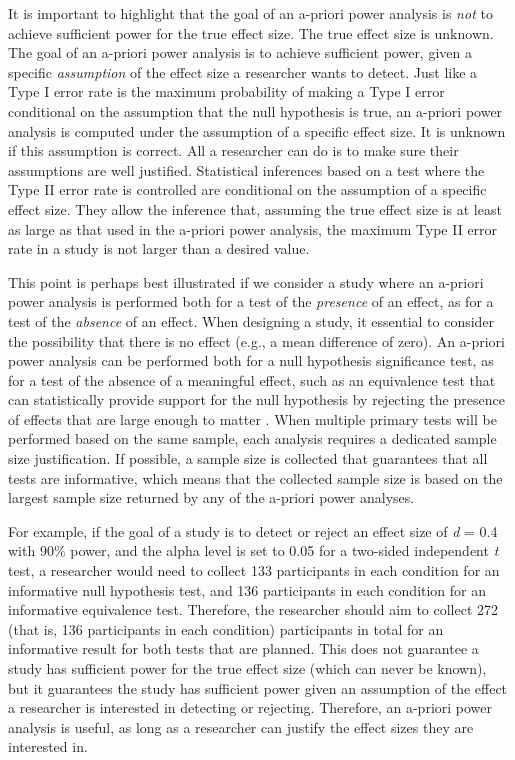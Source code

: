 \documentclass[
  oneside]{krantz}
\begin{document}
It is important to highlight that the goal of an a-priori power analysis is \emph{not} to achieve sufficient power for the true effect size. The true effect size is unknown. The goal of an a-priori power analysis is to achieve sufficient power, given a specific \emph{assumption} of the effect size a researcher wants to detect. Just like a Type I error rate is the maximum probability of making a Type I error conditional on the assumption that the null hypothesis is true, an a-priori power analysis is computed under the assumption of a specific effect size. It is unknown if this assumption is correct. All a researcher can do is to make sure their assumptions are well justified. Statistical inferences based on a test where the Type II error rate is controlled are conditional on the assumption of a specific effect size. They allow the inference that, assuming the true effect size is at least as large as that used in the a-priori power analysis, the maximum Type II error rate in a study is not larger than a desired value.

This point is perhaps best illustrated if we consider a study where an a-priori power analysis is performed both for a test of the \emph{presence} of an effect, as for a test of the \emph{absence} of an effect. When designing a study, it essential to consider the possibility that there is no effect (e.g., a mean difference of zero). An a-priori power analysis can be performed both for a null hypothesis significance test, as for a test of the absence of a meaningful effect, such as an equivalence test that can statistically provide support for the null hypothesis by rejecting the presence of effects that are large enough to matter \citep{meyners_equivalence_2012, lakens_equivalence_2017, rogers_using_1993}. When multiple primary tests will be performed based on the same sample, each analysis requires a dedicated sample size justification. If possible, a sample size is collected that guarantees that all tests are informative, which means that the collected sample size is based on the largest sample size returned by any of the a-priori power analyses.

For example, if the goal of a study is to detect or reject an effect size of \emph{d} = 0.4 with 90\% power, and the alpha level is set to 0.05 for a two-sided independent \emph{t} test, a researcher would need to collect 133 participants in each condition for an informative null hypothesis test, and 136 participants in each condition for an informative equivalence test. Therefore, the researcher should aim to collect 272 (that is, 136 participants in each condition) participants in total for an informative result for both tests that are planned. This does not guarantee a study has sufficient power for the true effect size (which can never be known), but it guarantees the study has sufficient power given an assumption of the effect a researcher is interested in detecting or rejecting. Therefore, an a-priori power analysis is useful, as long as a researcher can justify the effect sizes they are interested in.
\end{document}

